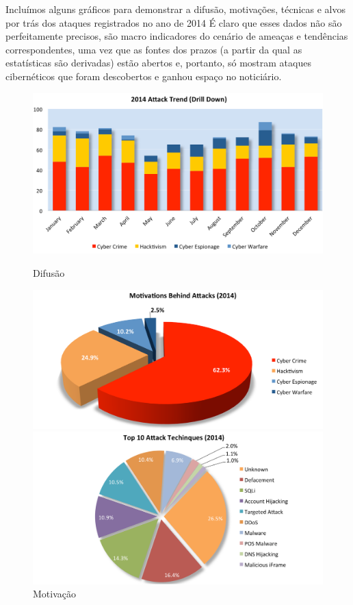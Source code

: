 Incluímos alguns gráficos para demonstrar a difusão, motivações, técnicas e alvos por trás dos ataques registrados no ano de 2014
É claro que esses dados não são perfeitamente precisos, são macro indicadores do cenário de ameaças e tendências correspondentes, uma vez que as fontes dos prazos (a partir da qual as estatísticas são derivadas) estão abertos e, portanto, só mostram ataques cibernéticos que foram descobertos e ganhou espaço no noticiário.




\begin{figure}
	\begin{minipage}{.5\textwidth}
	\includegraphics[scale=0.2]{Imagens/hackmageddon_trends.png}
		\caption{Difusão}
	\end{minipage}
	\begin{minipage}{.5\textwidth}
		\includegraphics[scale=0.2]{Imagens/hackmageddon_motivation.png}
		\caption{Motivação}
	\end{minipage}
	\begin{minipage}{.5\textwidth}
		\includegraphics[scale=0.2]{Imagens/hackmageddon_techniques.png}

\end{minipage}
\end{figure}
